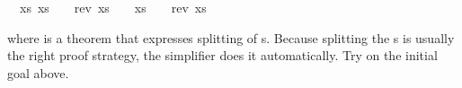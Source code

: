 \begin{isabellebody}
\begin{isamarkuptxt}
\begin{isabelle}
\ {}{}\ {}xs{}\ {}xs\ {}\ {}{}\ {}\ rev\ xs\ {}\ {}{}{}\ {}\ {}xs\ {}\ {}{}\ {}\ rev\ xs\ {}\ {}{}{}%
\end{isabelle}
where  is a theorem that expresses splitting of
s. Because
splitting the s is usually the right proof strategy, the
simplifier does it automatically.  Try 
on the initial goal above.


\end{isamarkuptxt}
\end{isabellebody}
